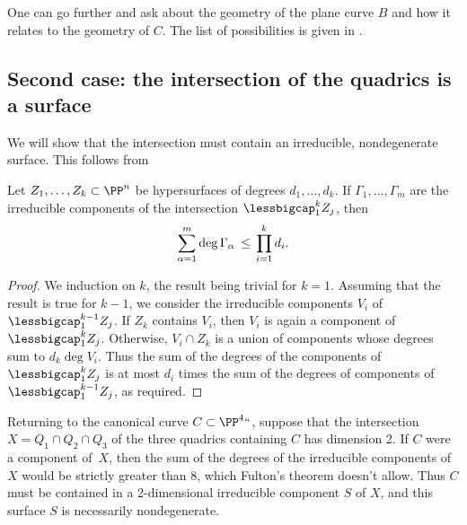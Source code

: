 One can go further and ask about the geometry of the plane curve $B$
and how it relates to the geometry of $C$. The list of possibilities
is given in \cite[p.~274]{ACGH}.

\subsection*{Second case: the intersection of the quadrics is a surface}
\label{trigonal genus 5} %

We will show that the intersection must contain an irreducible,
nondegenerate surface. This  follows from
%
%
%
%
%

\begin{npt}
\begin{theorem}
\label{Fulton Bezout}
Let $Z_1,\dots, Z_k \subset \PP^n$ be hypersurfaces of degrees $d_1,\dots,d_k$. If $\Gamma_1,\dots,\Gamma_m$ are the irreducible components of the intersection $\lessbigcap_1^kZ_j$, then
$$
\let\;\,
\sum_{\alpha = 1}^m \deg \Gamma_\alpha \; \leq \; \prod_{i=1}^k d_i.
$$
\end{theorem}
\end{npt}

\begin{proof}
We
induction on $k$, the result being trivial for $k=1$. Assuming that the result
is true for $k-1$, we consider the irreducible components $V_i$ of $\lessbigcap_1^{k-1}Z_j$. If $Z_k$ contains
$V_i$, then $V_i$ is again a component of $\lessbigcap_1^kZ_j$. Otherwise,
$V_i\cap Z_k$ is a union of components whose degrees sum to $d_k\deg V_i$. Thus
the sum of the degrees of the components of $\lessbigcap_1^kZ_j$ is at most $d_i$ times the
sum of the degrees of components of $\lessbigcap_1^{k-1}Z_j$, as required.
\meshing
\end{proof}

Returning to the canonical curve $C \subset \PP^4` `$, suppose that
the intersection $X = Q_1 \cap Q_2 \cap Q_3$ of the three quadrics
containing $C$ has dimension 2. If $C$ were a component of~$X$, then
the sum of the degrees of the irreducible components of $X$ would be
strictly greater than 8, which Fulton's theorem doesn't allow. Thus
$C$ must be contained in a 2-dimensional irreducible component  $S$ of
$X$, and this surface $S$ is necessarily nondegenerate.


